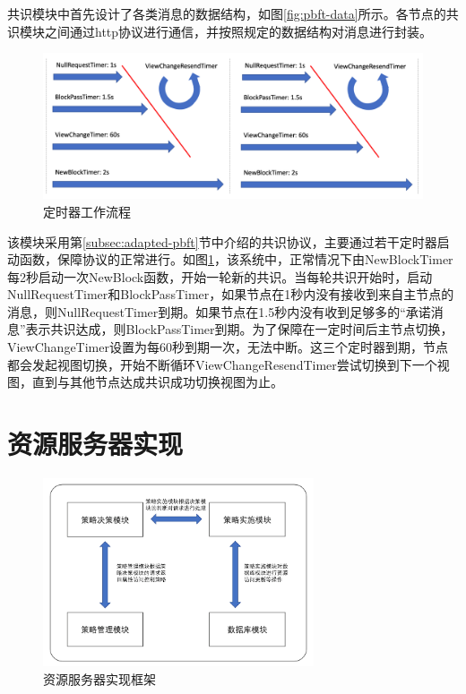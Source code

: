 共识模块中首先设计了各类消息的数据结构，如图\ref{fig:pbft-data}所示。各节点的共识模块之间通过http协议进行通信，并按照规定的数据结构对消息进行封装。

\begin{figure}
\centering
\includegraphics[width=12cm, keepaspectratio]{figures/timer.png}
\caption{定时器工作流程}
\label{fig:timer}
\end{figure}

该模块采用第\ref{subsec:adapted-pbft}节中介绍的共识协议，主要通过若干定时器启动函数，保障协议的正常进行。如图\ref{fig:timer}，该系统中，正常情况下由NewBlockTimer每2秒启动一次NewBlock函数，开始一轮新的共识。当每轮共识开始时，启动NullRequestTimer和BlockPassTimer，如果节点在1秒内没有接收到来自主节点的消息，则NullRequestTimer到期。如果节点在1.5秒内没有收到足够多的“承诺消息”表示共识达成，则BlockPassTimer到期。为了保障在一定时间后主节点切换，ViewChangeTimer设置为每60秒到期一次，无法中断。这三个定时器到期，节点都会发起视图切换，开始不断循环ViewChangeResendTimer尝试切换到下一个视图，直到与其他节点达成共识成功切换视图为止。

\section{资源服务器实现}

\begin{figure}[ht]
\centering
\includegraphics[width=8cm, keepaspectratio]{figures/imple-resource.png}
\caption{资源服务器实现框架}
\label{fig:imple-resource}
\end{figure}

